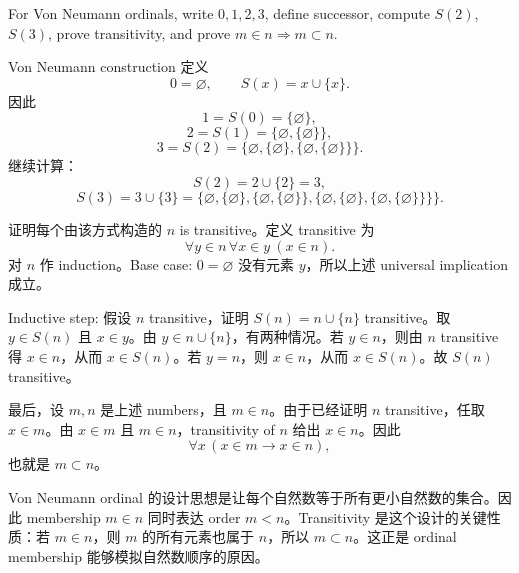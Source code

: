 \begin{exerciseblock}
For Von Neumann ordinals, write \(0,1,2,3\), define successor, compute \(S(2)\), \(S(3)\), prove transitivity, and prove \(m\in n\Rightarrow m\subset n\).
\end{exerciseblock}

\begin{solution}
Von Neumann construction 定义
\[
  0=\varnothing,\qquad S(x)=x\cup\{x\}.
\]
因此
\[
  1=S(0)=\{\varnothing\},
\]
\[
  2=S(1)=\{\varnothing,\{\varnothing\}\},
\]
\[
  3=S(2)=\{\varnothing,\{\varnothing\},\{\varnothing,\{\varnothing\}\}\}.
\]
继续计算：
\[
  S(2)=2\cup\{2\}=3,
\]
\[
  S(3)=3\cup\{3\}
  =\{\varnothing,\{\varnothing\},\{\varnothing,\{\varnothing\}\},
  \{\varnothing,\{\varnothing\},\{\varnothing,\{\varnothing\}\}\}\}.
\]

证明每个由该方式构造的 \(n\) is transitive。定义 transitive 为
\[
  \forall y\in n\,\forall x\in y\ (x\in n).
\]
对 \(n\) 作 induction。Base case: \(0=\varnothing\) 没有元素 \(y\)，所以上述 universal implication 成立。

Inductive step: 假设 \(n\) transitive，证明 \(S(n)=n\cup\{n\}\) transitive。取 \(y\in S(n)\) 且 \(x\in y\)。由 \(y\in n\cup\{n\}\)，有两种情况。若 \(y\in n\)，则由 \(n\) transitive 得 \(x\in n\)，从而 \(x\in S(n)\)。若 \(y=n\)，则 \(x\in n\)，从而 \(x\in S(n)\)。故 \(S(n)\) transitive。

最后，设 \(m,n\) 是上述 numbers，且 \(m\in n\)。由于已经证明 \(n\) transitive，任取 \(x\in m\)。由 \(x\in m\) 且 \(m\in n\)，transitivity of \(n\) 给出 \(x\in n\)。因此
\[
  \forall x\,(x\in m\to x\in n),
\]
也就是 \(m\subset n\)。
\end{solution}

\begin{explanation}
Von Neumann ordinal 的设计思想是让每个自然数等于所有更小自然数的集合。因此 membership \(m\in n\) 同时表达 order \(m<n\)。Transitivity 是这个设计的关键性质：若 \(m\in n\)，则 \(m\) 的所有元素也属于 \(n\)，所以 \(m\subset n\)。这正是 ordinal membership 能够模拟自然数顺序的原因。
\end{explanation}
